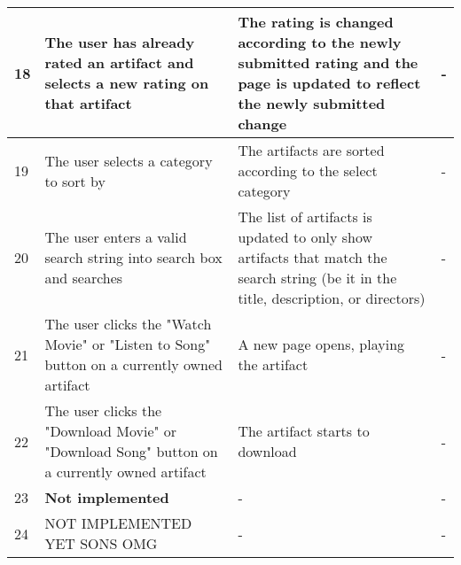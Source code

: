 \begin{table}
\begin{tabular}{ | p{2cm} | p{3cm} | p{4cm} | p{4cm} | }
	\hline
	18 & The user has already rated an artifact and selects a new rating on that artifact & The rating is changed according to the newly submitted rating and the page is updated to reflect the newly submitted change& - \\
	\hline
	19 & The user selects a category to sort by & The artifacts are sorted according to the select category & - \\
	\hline
	20 & The user enters a valid search string into search box and searches & The list of artifacts is updated to only show artifacts that match the search string (be it in the title, description, or directors) & - \\
	\hline
	21 & The user clicks the "Watch Movie" or "Listen to Song" button on a currently owned artifact & A new page opens, playing the artifact & - \\
	\hline
	22 & The user clicks the "Download Movie" or "Download Song" button on a currently owned artifact & The artifact starts to download & - \\
	\hline
	23 & \textbf{Not implemented}  & - & - \\
	\hline
	24 & NOT IMPLEMENTED YET SONS OMG & - & - \\
	\hline
\end{tabular}
\end{table}